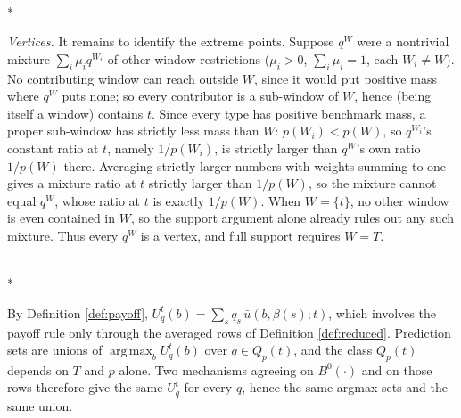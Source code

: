 \documentclass[12pt]{article}
\makeatletter
\theoremstyle{definition}
\renewenvironment{proof}[1][\proofname]{\par
  \pushQED{\qed}%
  \normalfont \topsep6\p@\@plus6\p@\relax
  \trivlist
  \item[\hskip\labelsep\itshape #1\@addpunct{.}]\mbox{}\\*
  \ignorespaces
}{%
  \popQED\endtrivlist\@endpefalse
}
\DeclareMathOperator*{\argmax}{arg\,max}
\makeatother
\begin{document}
\begin{proof}[Proof of Lemma \ref{lem:windows}]
\emph{Vertices.} It remains to identify the extreme points. Suppose $q^W$ were a nontrivial mixture $\sum_i \mu_i q^{W_i}$ of other window restrictions ($\mu_i > 0$, $\sum_i \mu_i = 1$, each $W_i \neq W$). No contributing window can reach outside $W$, since it would put positive mass where $q^W$ puts none; so every contributor is a sub-window of $W$, hence (being itself a window) contains $t$. Since every type has positive benchmark mass, a proper sub-window has strictly less mass than $W$: $p(W_i) < p(W)$, so $q^{W_i}$'s constant ratio at $t$, namely $1/p(W_i)$, is strictly larger than $q^W$'s own ratio $1/p(W)$ there. Averaging strictly larger numbers with weights summing to one gives a mixture ratio at $t$ strictly larger than $1/p(W)$, so the mixture cannot equal $q^W$, whose ratio at $t$ is exactly $1/p(W)$. When $W = \{t\}$, no other window is even contained in $W$, so the support argument alone already rules out any such mixture. Thus every $q^W$ is a vertex, and full support requires $W = T$.
\end{proof}

\begin{proof}[Proof of Lemma \ref{lem:reduction}]
By Definition \ref{def:payoff}, $U^t_q(b) = \sum_{s} q_s\, \bar u(b, \beta(s); t)$, which involves the payoff rule only through the averaged rows of Definition \ref{def:reduced}. Prediction sets are unions of $\argmax_b U^t_q(b)$ over $q \in Q_p(t)$, and the class $Q_p(t)$ depends on $T$ and $p$ alone. Two mechanisms agreeing on $B^0(\cdot)$ and on those rows therefore give the same $U^t_q$ for every $q$, hence the same argmax sets and the same union.
\end{proof}
\end{document}
